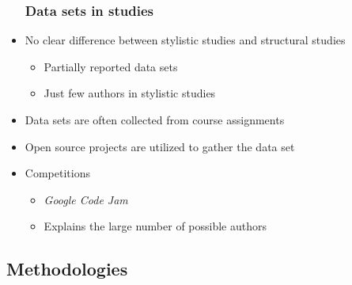 \documentclass[t,12pt,pdftex]{beamer}
\begin{document}
\begin{frame}
	\begin{itemize}
		\frametitle{Data sets in studies}
		\item No clear difference between stylistic studies and structural studies
		\begin{itemize}
			\item Partially reported data sets
			\item Just few authors in stylistic studies
		\end{itemize}
	\end{itemize}

\begin{table}[ht]
\centering
{}
\caption{Reported data sets used in papers}
\label{table:data}
\end{table}
\end{frame}

\begin{frame}
	\vspace{0.5in}
	\begin{itemize}
		\item Data sets are often collected from course assignments
		\item Open source projects are utilized to gather the data set
		\item Competitions
		\begin{itemize}
			\item \textit{Google Code Jam}
			\item Explains the large number of possible authors
		\end{itemize}
	\end{itemize}
\end{frame}

\subsection{Methodologies}
\end{document}
